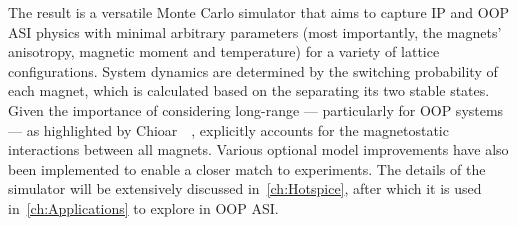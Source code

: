 The result is a versatile Monte Carlo simulator that aims to capture IP and OOP ASI physics with minimal arbitrary parameters (most importantly, the magnets' anisotropy, magnetic moment and temperature) for a variety of lattice configurations.
System dynamics are determined by the switching probability of each magnet, which is calculated based on the  separating its two stable states.
Given the importance of considering long-range  --- particularly for OOP systems --- as highlighted by Chioar~\etal~\cite{Chioar2014}, \hotspice{} explicitly accounts for the magnetostatic interactions between all magnets.
Various optional model improvements have also been implemented to enable a closer match to experiments.
The details of the \hotspice simulator will be extensively discussed in~\cref{ch:Hotspice}, after which it is used in~\cref{ch:Applications} to explore  in OOP ASI.
